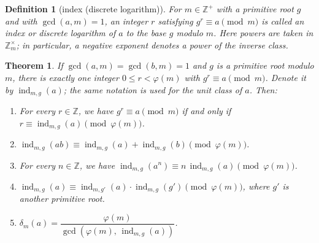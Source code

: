 \documentclass[11pt]{article}
\theoremstyle{ntstyle}
\newtheorem{theorem}{Theorem}[subsection]
\newtheorem{definition}{Definition}[subsection]
\newcommand{\ZmodUnits}[1]{\mathbb{Z}_{#1}^{\times}}
\DeclareMathOperator{\ind}{ind}
\begin{document}
\begin{definition}[index (discrete logarithm)]\label{def:6.3.1} For
	$m \in \mathbb{Z}^+$ with a primitive root $g$ and with $\gcd(a, m) =
		1$, an integer $r$ satisfying $g^{r} \equiv a \pmod{m}$ is called an
	index or discrete logarithm of $a$ to the base $g$ modulo $m$.
	Here powers are taken in $\ZmodUnits{m}$; in particular, a negative
	exponent denotes a power of the inverse class.

\end{definition}
\begin{theorem}\label{thm:6.3.1} If $\gcd(a, m) = \gcd(b, m) = 1$
	and $g$ is a primitive root modulo $m$, there is exactly one integer
	$0 \le r < \varphi(m)$ with $g^{r} \equiv a \pmod{m}$. Denote it by
	$\ind_{m,g}(a)$; the same notation is used for the unit class of $a$. Then:

	\begin{enumerate}[label={\alph*)}]
		\item For every $r\in\mathbb{Z}$, we have $g^{r} \equiv a \pmod{m}$ if and only if $r \equiv
			      \ind_{m,g}(a) \pmod{\varphi(m)}$.
		\item $\ind_{m,g}(ab) \equiv
			      \ind_{m,g}(a) + \ind_{m,g}(b) \pmod{\varphi(m)}$.
		\item For every $n\in\mathbb{Z}$, we have $\ind_{m,g}(a^{n}) \equiv n\,
			      \ind_{m,g}(a) \pmod{\varphi(m)}$.
		\item $\ind_{m,g}(a) \equiv
			      \ind_{m,g'}(a) \cdot \ind_{m,g}(g')
			      \pmod{\varphi(m)}$, where $g'$ is another primitive root.
		\item $\delta_m(a) = \dfrac{\varphi(m)}{\gcd(\varphi(m), \, \ind_{m,g}(a))}$.
	\end{enumerate}

\end{theorem}
\end{document}

